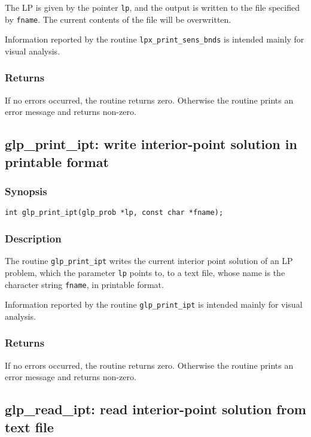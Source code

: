 The LP is given by the pointer \verb|lp|, and the output is written to
the file specified by \verb|fname|.  The current contents of the file
will be overwritten.

Information reported by the routine \verb|lpx_print_sens_bnds| is
intended mainly for visual analysis.

\subsubsection*{Returns}

If no errors occurred, the routine returns zero. Otherwise the routine
prints an error message and returns non-zero.

\subsection{glp\_print\_ipt: write interior-point solution in
printable format}

\subsubsection*{Synopsis}

\begin{verbatim}
int glp_print_ipt(glp_prob *lp, const char *fname);
\end{verbatim}

\subsubsection*{Description}

The routine \verb|glp_print_ipt| writes the current interior point
solution  of an LP problem, which the parameter \verb|lp| points to, to
a text file, whose name is the character string \verb|fname|, in
printable format.

Information reported by the routine \verb|glp_print_ipt| is intended
mainly for visual analysis.

\subsubsection*{Returns}

If no errors occurred, the routine returns zero. Otherwise the routine
prints an error message and returns non-zero.

\subsection{glp\_read\_ipt: read interior-point solution from text
file}

